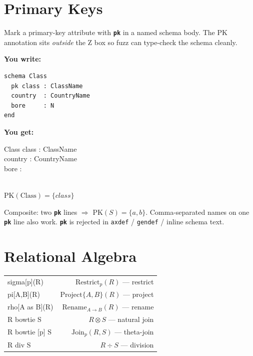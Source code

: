 \documentclass[10pt,landscape,a4paper]{article}
\newcommand{\kw}[1]{\texttt{\bfseries #1}}
\newenvironment{exwrite}%
  {\par\noindent\scriptsize\textbf{You write:}\par\vspace{0pt}\scriptsize}%
  {\vspace{1pt}}
\newenvironment{exget}%
  {\par\noindent\scriptsize\textbf{You get:}\par\vspace{0pt}\small}%
  {\par\vspace{3pt}}
\begin{document}
\begin{multicols}{3}
\raggedcolumns

\section{Primary Keys}

{\scriptsize Mark a primary-key attribute with \kw{pk} in a named schema body.
The PK annotation sits \emph{outside} the Z box so fuzz can type-check the schema cleanly.}

\begin{exwrite}
\begin{verbatim}
schema Class
  pk class : ClassName
  country  : CountryName
  bore     : N
end
\end{verbatim}
\end{exwrite}
\begin{exget}
\begin{center}
\begin{schema}{Class}
class : ClassName \\
country : CountryName \\
bore : \nat
\end{schema}\\[2pt]
\noindent$\mathrm{PK}(\mathrm{Class}) = \{class\}$
\end{center}
\end{exget}

{\scriptsize Composite: two \kw{pk} lines $\Rightarrow$ $\mathrm{PK}(S)=\{a,b\}$.
Comma-separated names on one \kw{pk} line also work.
\kw{pk} is rejected in \texttt{axdef} / \texttt{gendef} / inline schema text.}

\section{Relational Algebra}

\begin{tabularx}{\columnwidth}{LR}
sigma[p](R)          & $\mathrm{Restrict}_{p}(R)$ — restrict \\
pi[A,B](R)           & $\mathrm{Project}\{A,B\}(R)$ — project \\
rho[A as B](R)       & $\mathrm{Rename}_{A \to B}(R)$ — rename \\
R bowtie S           & $R \otimes S$ — natural join \\
R bowtie [p] S       & $\mathrm{Join}_{p}(R, S)$ — theta-join \\
R div S              & $R \div S$ — division \\
\end{tabularx}


\end{multicols}
\end{document}
